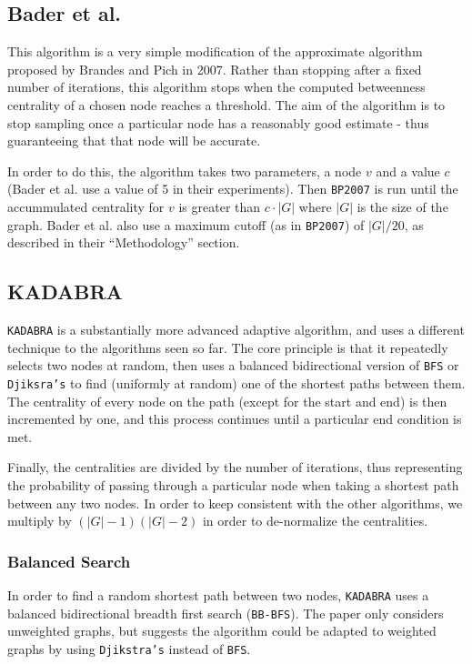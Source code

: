\documentclass[12pt,a4paper,twoside,openright]{report}
\newcommand{\ttt}[1]{\texttt{#1}}
\begin{document}
	\subsection{Bader et al.}
	
	This algorithm is a very simple modification of the approximate algorithm proposed by Brandes and Pich in 2007. Rather than stopping after a fixed number of iterations, this algorithm stops when the computed betweenness centrality of a chosen node reaches a threshold. The aim of the algorithm is to stop sampling once a particular node has a reasonably good estimate - thus guaranteeing that that node will be accurate.
	
	In order to do this, the algorithm takes two parameters, a node $v$ and a value $c$ (Bader et al. use a value of 5 in their experiments). Then \ttt{BP2007} is run until the accummulated centrality for $v$ is greater than $c \cdot |G|$ where $|G|$ is the size of the graph. Bader et al. also use a maximum cutoff (as in \ttt{BP2007}) of $|G|/20$, as described in their ``Methodology'' section.
	
	\subsection{KADABRA}
	
	\ttt{KADABRA} is a substantially more advanced adaptive algorithm, and uses a different technique to the algorithms seen so far. The core principle is that it repeatedly selects two nodes at random, then uses a balanced bidirectional version of \ttt{BFS} or \ttt{Djiksra's} to find (uniformly at random) one of the shortest paths between them. The centrality of every node on the path (except for the start and end) is then incremented by one, and this process continues until a particular end condition is met.
	
	Finally, the centralities are divided by the number of iterations, thus representing the probability of passing through a particular node when taking a shortest path between any two nodes. In order to keep consistent with the other algorithms, we multiply by $(|G|-1)(|G|-2)$ in order to de-normalize the centralities.
	
	\subsubsection{Balanced Search} \label{sec:balancedsearch}
	In order to find a random shortest path between two nodes, \ttt{KADABRA} uses a balanced bidirectional breadth first search (\ttt{BB-BFS}). The paper only considers unweighted graphs, but suggests the algorithm could be adapted to weighted graphs by using \ttt{Djikstra's} instead of \ttt{BFS}.
	
\end{document}
